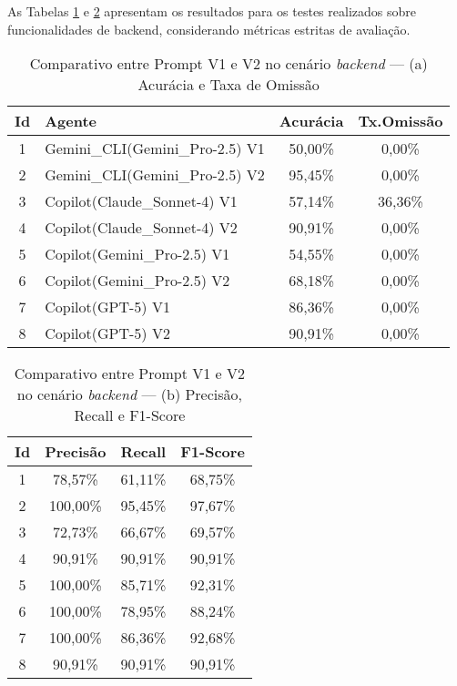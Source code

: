 As Tabelas \ref{tab:backend-a} e \ref{tab:backend-b} apresentam os resultados para os testes realizados sobre funcionalidades de backend, considerando métricas estritas de avaliação.
\begin{table}[H]
\centering
\caption{Comparativo entre Prompt V1 e V2 no cenário \textit{backend} — (a) Acurácia e Taxa de Omissão}
\label{tab:backend-a}
\begin{tabular}{|c|l|c|c|}
\hline
\textbf{Id} & \textbf{Agente} & \textbf{Acurácia} & \textbf{Tx.Omissão} \\
\hline
1 & Gemini\_CLI(Gemini\_Pro-2{.}5) V1 & 50{,}00\% & 0{,}00\% \\
2 & Gemini\_CLI(Gemini\_Pro-2{.}5) V2 & 95{,}45\% & 0{,}00\% \\
\hline
3 & Copilot(Claude\_Sonnet-4) V1      & 57{,}14\% & 36{,}36\% \\
4 & Copilot(Claude\_Sonnet-4) V2      & 90{,}91\% & 0{,}00\% \\
\hline
5 & Copilot(Gemini\_Pro-2{.}5) V1     & 54{,}55\% & 0{,}00\% \\
6 & Copilot(Gemini\_Pro-2{.}5) V2     & 68{,}18\% & 0{,}00\% \\
\hline
7 & Copilot(GPT-5) V1                 & 86{,}36\% & 0{,}00\% \\
8 & Copilot(GPT-5) V2                 & 90{,}91\% & 0{,}00\% \\
\hline
\end{tabular}
\vspace{0.8em}
\end{table}

\begin{table}[H]
\centering
\caption{Comparativo entre Prompt V1 e V2 no cenário \textit{backend} — (b) Precisão, Recall e F1-Score}
\label{tab:backend-b}
\begin{tabular}{|c|c|c|c|}
\hline
\textbf{Id} & \textbf{Precisão} & \textbf{Recall} & \textbf{F1-Score} \\
\hline
1 & 78{,}57\% & 61{,}11\% & 68{,}75\% \\
2 & 100{,}00\%& 95{,}45\% & 97{,}67\% \\
\hline
3 & 72{,}73\% & 66{,}67\% & 69{,}57\% \\
4 & 90{,}91\% & 90{,}91\% & 90{,}91\% \\
\hline
5 & 100{,}00\%& 85{,}71\% & 92{,}31\% \\
6 & 100{,}00\%& 78{,}95\% & 88{,}24\% \\
\hline
7 & 100{,}00\%& 86{,}36\% & 92{,}68\% \\
8 & 90{,}91\% & 90{,}91\% & 90{,}91\% \\
\hline
\end{tabular}
\vspace{0.8em}
\end{table}

